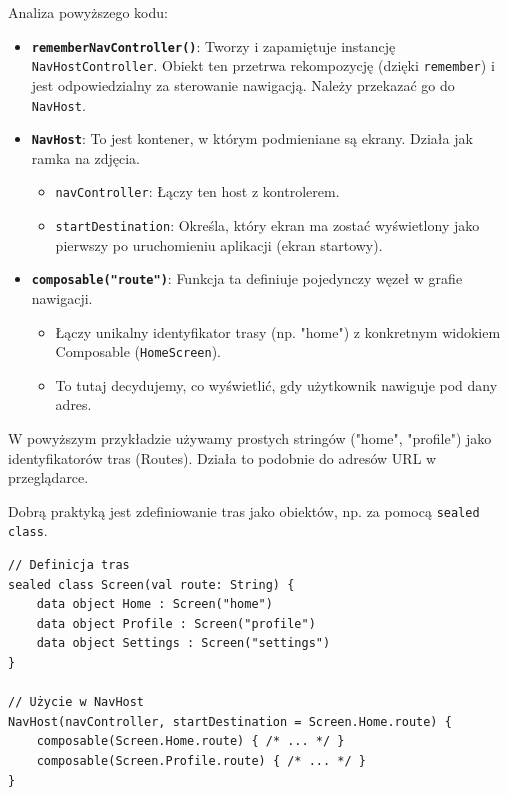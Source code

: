 Analiza powyższego kodu:

\begin{itemize}
    \item \textbf{\texttt{rememberNavController()}}: Tworzy i zapamiętuje instancję \texttt{NavHostController}. Obiekt ten przetrwa rekompozycję (dzięki \texttt{remember}) i jest odpowiedzialny za sterowanie nawigacją. Należy przekazać go do \texttt{NavHost}.
    
    \item \textbf{\texttt{NavHost}}: To jest kontener, w którym podmieniane są ekrany. Działa jak ramka na zdjęcia.
    \begin{itemize}
        \item \texttt{navController}: Łączy ten host z kontrolerem.
        \item \texttt{startDestination}: Określa, który ekran ma zostać wyświetlony jako pierwszy po uruchomieniu aplikacji (ekran startowy).
    \end{itemize}

    \item \textbf{\texttt{composable("route")}}: Funkcja ta definiuje pojedynczy węzeł w grafie nawigacji.
    \begin{itemize}
        \item Łączy unikalny identyfikator trasy (np. "home") z konkretnym widokiem Composable (\texttt{HomeScreen}).
        \item To tutaj decydujemy, co wyświetlić, gdy użytkownik nawiguje pod dany adres.
    \end{itemize}
\end{itemize}

W powyższym przykładzie używamy prostych stringów ("home", "profile") jako identyfikatorów tras (Routes). Działa to podobnie do adresów URL w przeglądarce.

Dobrą praktyką jest zdefiniowanie tras jako obiektów, np. za pomocą \texttt{sealed class}.

\begin{verbatim}
// Definicja tras
sealed class Screen(val route: String) {
    data object Home : Screen("home")
    data object Profile : Screen("profile")
    data object Settings : Screen("settings")
}

// Użycie w NavHost
NavHost(navController, startDestination = Screen.Home.route) {
    composable(Screen.Home.route) { /* ... */ }
    composable(Screen.Profile.route) { /* ... */ }
}
\end{verbatim}

